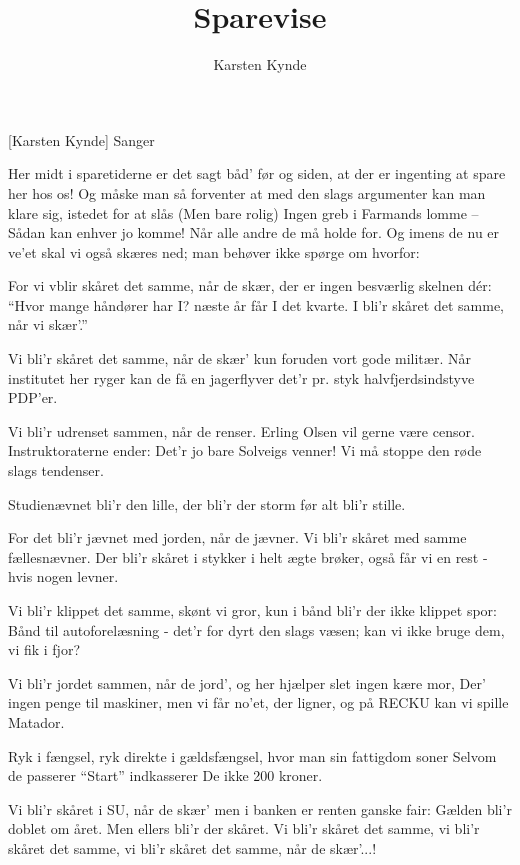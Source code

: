\documentclass[a4paper,11pt]{article}
\title{Sparevise}
\author{Karsten Kynde}
\begin{document}
\maketitle

\begin{roles}
[Karsten Kynde] Sanger
\end{roles}

\begin{song}
  Her midt i sparetiderne
  er det sagt båd' før og siden, at
  der er ingenting at spare her hos os!
  Og måske man så forventer
  at med den slags argumenter
  kan man klare sig, istedet for at slås
  (Men bare rolig)
  Ingen greb i Farmands lomme --
  Sådan kan enhver jo komme!
  Når alle andre de må holde for.
  Og imens de nu er ve'et
  skal vi også skæres ned;
  man behøver ikke spørge om hvorfor:

  For vi vblir skåret det samme, når de skær,
  der er ingen besværlig skelnen dér:
  "`Hvor mange håndører har I?
  næste år får I det kvarte.
  I bli'r skåret det samme, når vi skær'."'

  Vi bli'r skåret det samme, når de skær'
  kun foruden vort gode militær.
  Når institutet her ryger
  kan de få en jagerflyver
  det'r pr. styk halvfjerdsindstyve PDP'er.

  Vi bli'r udrenset sammen, når de renser.
  Erling Olsen vil gerne være censor.
  Instruktoraterne ender:
  Det'r jo bare Solveigs venner!
  Vi må stoppe den røde slags tendenser.

  Studienævnet bli'r den lille,
  der bli'r der storm før alt bli'r stille.

  For det bli'r jævnet med jorden, når de jævner.
  Vi bli'r skåret med samme fællesnævner.
  Der bli'r skåret i stykker
  i helt ægte brøker,
  også får vi en rest - hvis nogen levner.

  Vi bli'r klippet det samme, skønt vi gror,
  kun i bånd bli'r der ikke klippet spor:
  Bånd til autoforelæsning -
  det'r for dyrt den slags væsen;
  kan vi ikke bruge dem, vi fik i fjor?

  Vi bli'r jordet sammen, når de jord',
  og her hjælper slet ingen kære mor,
  Der' ingen penge til maskiner,
  men vi får no'et, der ligner,
  og på RECKU kan vi spille Matador.

  Ryk i fængsel, ryk direkte i gældsfængsel,
  hvor man sin fattigdom soner
  Selvom de passerer "`Start"' indkasserer De ikke 200 kroner.

  Vi bli'r skåret i SU, når de skær'
  men i banken er renten ganske fair:
  Gælden bli'r doblet om året.
  Men ellers bli'r der skåret.
  Vi bli'r skåret det samme,
  vi bli'r skåret det samme,
  vi bli'r skåret det samme, når de skær'...!
\end{song}
\end{document}
